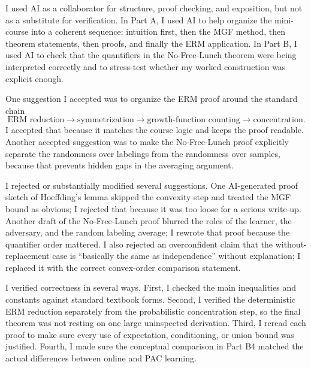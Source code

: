 \documentclass[11pt]{article}
\begin{document}
\begin{solutionbox}
I used AI as a collaborator for structure, proof checking, and exposition, but not as a substitute for verification. In Part A, I used AI to help organize the mini-course into a coherent sequence: intuition first, then the MGF method, then theorem statements, then proofs, and finally the ERM application. In Part B, I used AI to check that the quantifiers in the No-Free-Lunch theorem were being interpreted correctly and to stress-test whether my worked construction was explicit enough.

One suggestion I accepted was to organize the ERM proof around the standard chain
\[
\text{ERM reduction} \to \text{symmetrization} \to \text{growth-function counting} \to \text{concentration}.
\]
I accepted that because it matches the course logic and keeps the proof readable. Another accepted suggestion was to make the No-Free-Lunch proof explicitly separate the randomness over labelings from the randomness over samples, because that prevents hidden gaps in the averaging argument.

I rejected or substantially modified several suggestions. One AI-generated proof sketch of Hoeffding's lemma skipped the convexity step and treated the MGF bound as obvious; I rejected that because it was too loose for a serious write-up. Another draft of the No-Free-Lunch proof blurred the roles of the learner, the adversary, and the random labeling average; I rewrote that proof because the quantifier order mattered. I also rejected an overconfident claim that the without-replacement case is “basically the same as independence” without explanation; I replaced it with the correct convex-order comparison statement.

I verified correctness in several ways. First, I checked the main inequalities and constants against standard textbook forms. Second, I verified the deterministic ERM reduction separately from the probabilistic concentration step, so the final theorem was not resting on one large uninspected derivation. Third, I reread each proof to make sure every use of expectation, conditioning, or union bound was justified. Fourth, I made sure the conceptual comparison in Part B4 matched the actual differences between online and PAC learning.


\end{solutionbox}
\end{document}
